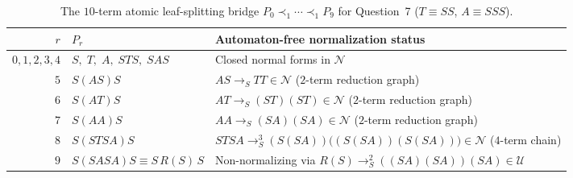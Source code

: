 \documentclass[11pt,reqno]{amsart}
\numberwithin{equation}{section}
\theoremstyle{plain}
\theoremstyle{definition}
\theoremstyle{remark}
\newcommand{\redS}{\to_S}
\begin{document}
\begin{table}[htbp]
\centering
\caption{The $10$-term atomic leaf-splitting bridge $P_0 \prec_1 \cdots \prec_1 P_9$ for Question~7 ($T \equiv S S$, $A \equiv S S S$).}
\label{tab:atomic-bridge}
\small
\begin{tabular}{@{}rll@{}}
\toprule
$r$ & $P_r$ & Automaton-free normalization status \\
\midrule
$0, 1, 2, 3, 4$ & $S,\; T,\; A,\; S T S,\; S A S$ & Closed normal forms in $\mathcal{N}$ \\
$5$ & $S(A S)S$ & $A S \redS T T \in \mathcal{N}$ ($2$-term reduction graph) \\
$6$ & $S(A T)S$ & $A T \redS (S T)(S T) \in \mathcal{N}$ ($2$-term reduction graph) \\
$7$ & $S(A A)S$ & $A A \redS (S A)(S A) \in \mathcal{N}$ ($2$-term reduction graph) \\
$8$ & $S(S T S A)S$ & $S T S A \redS^3 (S(S A))\bigl((S(S A))(S(S A))\bigr) \in \mathcal{N}$ ($4$-term chain) \\
$9$ & $S(S A S A)S \equiv S\,R(S)\,S$ & Non-normalizing via $R(S) \redS^2 ((S A)(S A))(S A) \in \mathcal{U}$ \\
\bottomrule
\end{tabular}
\end{table}
\end{document}

